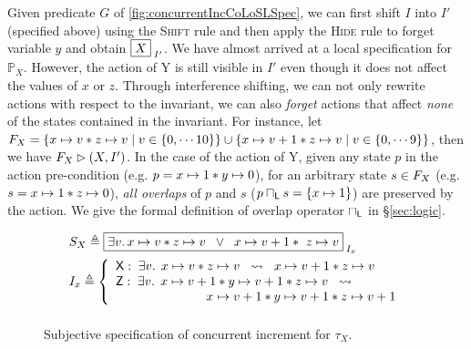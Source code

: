 Given predicate $G$ of \fig\ref{fig:concurrentIncCoLoSLSpec}, we can first shift $I$ into $I'$ (specified above) using the \textsc{Shift} rule and then apply the \textsc{Hide} rule to forget variable $y$ and obtain $\boxed{X}_{\; I'}$.
We have almost arrived at a local specification for $\mathbb{P}_X$. However, the action of \textsf{Y} is still visible in $I'$ even though it does not affect the values of $x$ or $z$. Through interference shifting, we can not only rewrite actions with respect to the invariant, we can also \emph{forget} actions that affect \emph{none} of the states contained in the invariant. For instance, let $F_{X} = \left\{x \mapsto v * z \mapsto v \;|\; v \in \{0, \cdots 10\} \right\} \cup \left\{x \mapsto v+1 * z \mapsto v \;|\; v \in \{0, \cdots 9 \} \right\}$, then we have $F_{X} \rhd (X, I')$. In the case of the action of \textsf{Y}, given any state $p$ in the action pre-condition (e.g. $p = x \mapsto 1 * y \mapsto 0$), for an arbitrary state $s \in F_{X}$ (e.g. $s = x \mapsto 1 * z \mapsto 0$), \emph{all overlaps} of $p$ and $s$ ($p \sqcap_{\textsf{L}} s = \{x \mapsto 1\}$) are preserved by the action. We give the formal definition of overlap operator $\sqcap_{\textsf{L}}$ in \S\ref{sec:logic}. 
%
%
\begin{figure}
\noindent\makebox[\linewidth]{\rule{\linewidth}{1pt}}
%
\[
\begin{array}{l }
	S_{X} \eqdef 
	\shared{
		\exsts{v}   \cell{x}{v}  * \cell{z}{v}  \;\;\lor\;\; \cell{x}{v+1}  *\ \cell{z}{v}	
	}{I_x}\vspace*{5pt}\\
	

	
	I_x \eqdef \left\{
		\begin{array}{l}
			\textsf{X}:\; \exsts{v}\; \cell{x}{v} * \cell{z}{v}  \hspace*{0.2cm}\swap\hspace*{0.2cm}  \cell{x}{v+1} * \cell{z}{v}\\
			\textsf{Z}:\; \exsts{v}\; \cell{x}{v+1} *  \cell{y}{v+1} * \cell{z}{v}\hspace*{0.2cm}\swap\\
			\hspace*{2.5cm} \cell{x}{v+1} * \cell{y}{v+1} * \cell{z}{v+1}\\
		\end{array}			
	
	\right.
	\vspace*{5pt}\\
	
\end{array} \vspace*{-5pt}
\]
%
\noindent\makebox[\linewidth]{\rule{\linewidth}{1pt}}
\caption{Subjective specification of concurrent increment for $\tau_X$.}
\label{fig:concurrentIncSubjectiveSpec}
\end{figure} 
%
%

